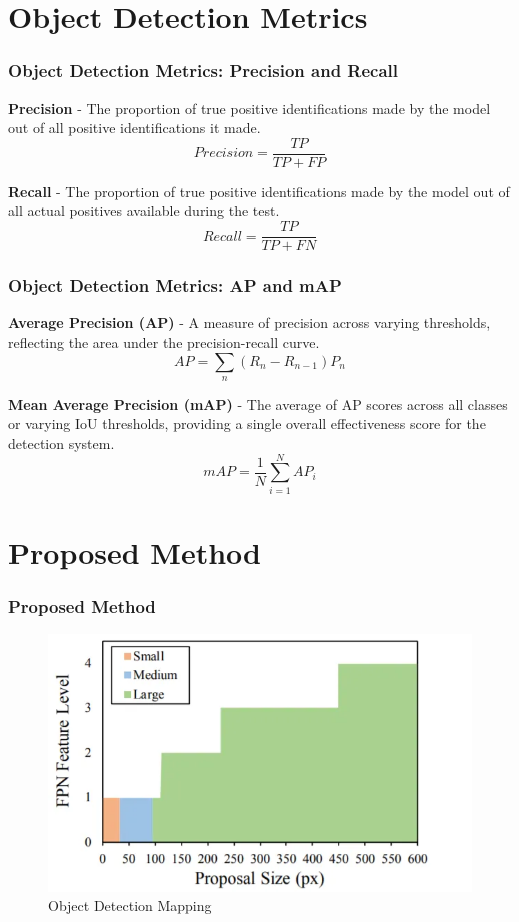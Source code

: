 \documentclass{beamer}
\begin{document}
\section{Object Detection Metrics}
\begin{frame}
  \frametitle{Object Detection Metrics: Precision and Recall}
  \textbf{Precision} - The proportion of true positive identifications made by the model out of all positive identifications it made.
  \[
  Precision = \frac{TP}{TP + FP}
  \]
  
  \textbf{Recall} - The proportion of true positive identifications made by the model out of all actual positives available during the test.
  \[
  Recall = \frac{TP}{TP + FN}
  \]
\end{frame}


\begin{frame}
  \frametitle{Object Detection Metrics: AP and mAP}
  \textbf{Average Precision (AP)} - A measure of precision across varying thresholds, reflecting the area under the precision-recall curve.
  \[
  AP = \sum_{n} (R_n - R_{n-1}) P_n
  \]
  
  \textbf{Mean Average Precision (mAP)} - The average of AP scores across all classes or varying IoU thresholds, providing a single overall effectiveness score for the detection system.
  \[
  mAP = \frac{1}{N} \sum_{i=1}^{N} AP_i
  \]
\end{frame}



\section{Proposed Method}
\begin{frame}
  \frametitle{Proposed Method}
  \begin{figure}[h!]
    \centering
    \includegraphics[scale=0.5]{Figures/efpn-sod-mapping.jpg}
    \caption{Object Detection Mapping}
    \label{fig:sod-problem}
  \end{figure}
\end{frame}
\end{document}
